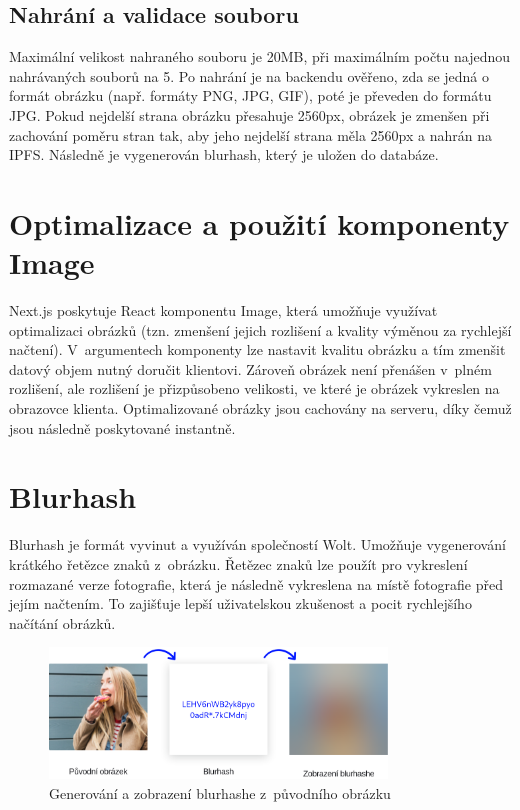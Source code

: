 \documentclass[12pt, a4paper,
  oneside,      %
]{report}
\begin{document}
\subsection{Nahrání a validace souboru} Maximální velikost nahraného souboru je 20MB, při maximálním počtu najednou nahrávaných souborů na 5.  Po nahrání je na backendu ověřeno, zda se jedná o formát obrázku (např. formáty PNG, JPG, GIF), poté je převeden do formátu JPG. Pokud nejdelší strana obrázku přesahuje 2560px, obrázek je zmenšen při zachování poměru stran tak, aby jeho nejdelší strana měla 2560px a nahrán na IPFS. Následně je vygenerován blurhash, který je uložen do databáze.
\section{Optimalizace a použití komponenty Image}\label{subsubsection:nextImageComponent}
Next.js poskytuje React komponentu Image, která umožňuje využívat optimalizaci obrázků (tzn. zmenšení jejich rozlišení a kvality výměnou za rychlejší načtení). V~argumentech komponenty lze nastavit kvalitu obrázku a tím zmenšit datový objem nutný doručit klientovi. Zároveň obrázek není přenášen v~plném rozlišení, ale rozlišení je přizpůsobeno velikosti, ve které je obrázek vykreslen na obrazovce klienta. Optimalizované obrázky jsou cachovány na serveru, díky čemuž jsou následně poskytované instantně. \cite{nextImage} 
\section{Blurhash}\label{subsection:blurhash}
Blurhash je formát vyvinut a využíván společností Wolt. Umožňuje vygenerování krátkého řetězce znaků z~obrázku. Řetězec znaků lze použít pro vykreslení rozmazané verze fotografie, která je následně vykreslena na místě fotografie před jejím načtením. To zajišťuje lepší uživatelskou zkušenost a pocit rychlejšího načítání obrázků. \cite{blurhash}\cite{blurhashWoltBlog}

\begin{figure}[h]
	\centering
	\includegraphics[width=0.8\textwidth]{images/blurhash.png}
	\caption{Generování a zobrazení blurhashe z~původního obrázku \cite{blurhashScreenshot}}
\end{figure}
\end{document}
